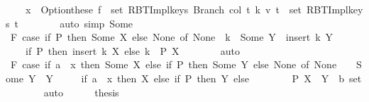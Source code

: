 \begin{isabellebody}
\ \ \ \ x\ {\isasymin}\ Option{\isachardot}{\kern0pt}these\ {\isacharparenleft}{\kern0pt}f\ {\isacharbackquote}{\kern0pt}\ set\ {\isacharparenleft}{\kern0pt}RBT{\isacharunderscore}{\kern0pt}Impl{\isachardot}{\kern0pt}keys\ {\isacharparenleft}{\kern0pt}Branch\ col\ t{}\ k\ v\ t{}{\isacharparenright}{\kern0pt}{\isacharparenright}{\kern0pt}{\isacharparenright}{\kern0pt}\ {\isasymunion}\ set\ {\isacharparenleft}{\kern0pt}RBT{\isacharunderscore}{\kern0pt}Impl{\isachardot}{\kern0pt}keys\ t{\isacharprime}{\kern0pt}{\isacharparenright}{\kern0pt}{\isachardoublequoteclose}\isanewline
\ \ \ \ \ \ \isamarkupfalse%
\ {\isacharparenleft}{\kern0pt}auto\ simp{\isacharcolon}{\kern0pt}\ Some{\isacharparenright}{\kern0pt}\isanewline
\ \ \ \ \isamarkupfalse%
\ F{}{\isacharcolon}{\kern0pt}\ {\isachardoublequoteopen}{\isacharparenleft}{\kern0pt}case\ if\ P\ then\ Some\ X\ else\ None\ of\ None\ {\isasymRightarrow}\ {\isacharbraceleft}{\kern0pt}k{\isacharbraceright}{\kern0pt}\ {\isacharbar}{\kern0pt}\ Some\ Y\ {\isasymRightarrow}\ insert\ k\ Y{\isacharparenright}{\kern0pt}\ {\isacharequal}{\kern0pt}\isanewline
\ \ \ \ {\isacharparenleft}{\kern0pt}if\ P\ then\ {\isacharparenleft}{\kern0pt}insert\ k\ X{\isacharparenright}{\kern0pt}\ else\ {\isacharbraceleft}{\kern0pt}k{\isacharbraceright}{\kern0pt}{\isacharparenright}{\kern0pt}{\isachardoublequoteclose}\ \ P\ X\isanewline
\ \ \ \ \ \ \isamarkupfalse%
\ auto\isanewline
\ \ \ \ \isamarkupfalse%
\ F{}{\isacharcolon}{\kern0pt}\ {\isachardoublequoteopen}{\isacharparenleft}{\kern0pt}case\ if\ a\ {\isacharequal}{\kern0pt}\ x\ then\ Some\ X\ else\ if\ P\ then\ Some\ Y\ else\ None\ of\ None\ {\isasymRightarrow}\ {\isacharbraceleft}{\kern0pt}{\isacharbraceright}{\kern0pt}\ {\isacharbar}{\kern0pt}\ Some\ Y\ {\isasymRightarrow}\ Y{\isacharparenright}{\kern0pt}\ {\isacharequal}{\kern0pt}\isanewline
\ \ \ \ {\isacharparenleft}{\kern0pt}if\ a\ {\isacharequal}{\kern0pt}\ x\ then\ X\ else\ if\ P\ then\ Y\ else\ {\isacharbraceleft}{\kern0pt}{\isacharbraceright}{\kern0pt}{\isacharparenright}{\kern0pt}{\isachardoublequoteclose}\isanewline
\ \ \ \ \ \ \ P\ X\ \ Y\ {\isacharcolon}{\kern0pt}{\isacharcolon}{\kern0pt}\ {\isachardoublequoteopen}{\isacharprime}{\kern0pt}b\ set{\isachardoublequoteclose}\isanewline
\ \ \ \ \ \ \isamarkupfalse%
\ auto\isanewline
\ \ \ \ \isamarkupfalse%
\ {\isacharquery}{\kern0pt}thesis\isanewline
\ \ \ \ \ \ \isamarkupfalse%

\end{isabellebody}
